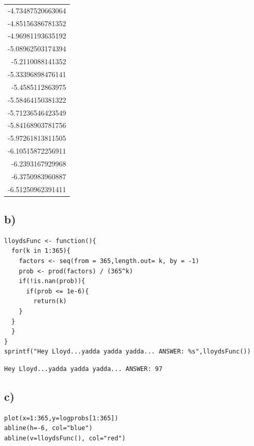 \documentclass[11pt]{article}
\begin{document}
\begin{center}
\begin{tabular}{r}
-4.73487520663064\\
-4.85156386781352\\
-4.96981193635192\\
-5.08962503174394\\
-5.2110088141352\\
-5.33396898476141\\
-5.4585112863975\\
-5.58464150381322\\
-5.71236546423549\\
-5.84168903781756\\
-5.97261813811505\\
-6.10515872256911\\
-6.2393167929968\\
-6.3750983960887\\
-6.51250962391411\\
\end{tabular}
\end{center}

\subsection*{b)}
\label{sec:org4acd6c0}

\begin{verbatim}
lloydsFunc <- function(){
  for(k in 1:365){
    factors <- seq(from = 365,length.out= k, by = -1)
    prob <- prod(factors) / (365^k)
    if(!is.nan(prob)){
      if(prob <= 1e-6){
        return(k)
    }
  }
  }
}
sprintf("Hey Lloyd...yadda yadda yadda... ANSWER: %s",lloydsFunc())
\end{verbatim}

\begin{verbatim}
Hey Lloyd...yadda yadda yadda... ANSWER: 97
\end{verbatim}


\subsection*{c)}
\label{sec:org489d585}

\begin{verbatim}
plot(x=1:365,y=logprobs[1:365])
abline(h=-6, col="blue")
abline(v=lloydsFunc(), col="red")
\end{verbatim}
\end{document}
